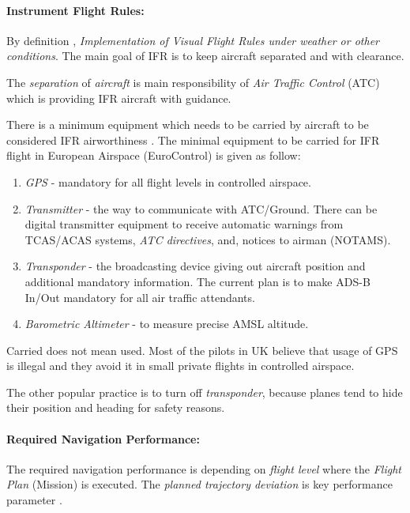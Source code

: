 \paragraph{Instrument Flight Rules:} By definition \cite{icaoAnnex2}, \emph{Implementation of Visual Flight Rules under weather or other conditions}. The main goal of IFR is to keep aircraft separated and with clearance.

The \emph{separation} of \emph{aircraft} is main responsibility of \emph{Air Traffic Control} (ATC) which is providing IFR aircraft with guidance.

There is a minimum equipment which needs to be carried by aircraft to be considered IFR airworthiness \cite{icao4444}. The minimal equipment to be carried for IFR flight in European Airspace (EuroControl) is given as follow:
\begin{enumerate}
    \item \emph{GPS} - mandatory for all flight levels in controlled airspace. 
    
    \item \emph{Transmitter} - the way to communicate with ATC/Ground. There can be digital transmitter equipment to receive automatic warnings from TCAS/ACAS systems, \emph{ATC directives}, and, notices to airman (NOTAMS).
    
    \item \emph{Transponder} - the broadcasting device giving out aircraft position and additional mandatory information. The current plan is to make ADS-B In/Out mandatory for all air traffic attendants.
    
    \item \emph{Barometric Altimeter} - to measure precise AMSL altitude.
\end{enumerate}


\begin{note}
    Carried does not mean used. Most of the pilots in UK believe that usage of GPS is illegal and they avoid it in small private flights in controlled airspace.
    
    The other popular practice is to turn off \emph{transponder}, because planes tend to hide their position and heading for safety reasons.
\end{note}

\paragraph{Required Navigation Performance:} The required navigation performance is depending on \emph{flight level} where the \emph{Flight Plan} (Mission) is executed. The \emph{planned trajectory deviation} is key performance parameter \cite{icao4444}.